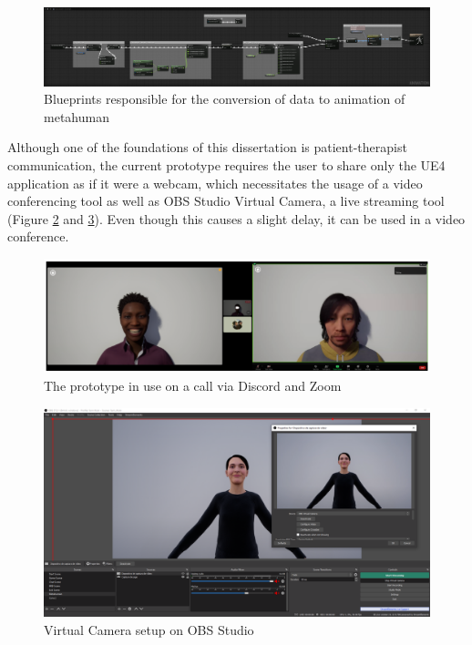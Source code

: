 \begin{figure}[!htb]
\includegraphics[width=\textwidth]{figures/facialConfig.png}
\centering
\caption{Blueprints responsible for the conversion of data to animation of metahuman}
\label{fig:blueprintAnimation}
\end{figure}

Although one of the foundations of this dissertation is patient-therapist communication, the current prototype requires the user to share only the UE4 application as if it were a webcam, which necessitates the usage of a video conferencing tool as well as OBS Studio Virtual Camera, a live streaming tool (Figure \ref{fig:prototype} and \ref{fig:obs}). Even though this causes a slight delay, it can be used in a video conference.

\begin{figure}[!htb]
\includegraphics[width=\textwidth]{figures/zoomAndDiscord.PNG}
\centering
\caption{The prototype in use on a call via Discord and Zoom}
\label{fig:prototype}
\end{figure}

\begin{figure}[!htb]
\includegraphics[width=\textwidth]{figures/streamingTool.PNG}
\centering
\caption{Virtual Camera setup on OBS Studio}
\label{fig:obs}
\end{figure}

